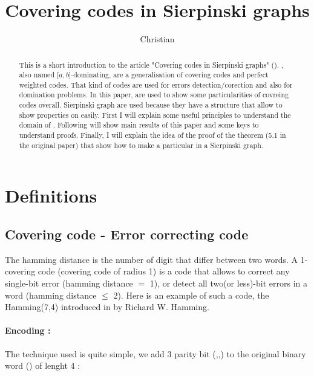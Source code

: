 \documentclass[10pt,a4paper,notitlepage]{article}
\title{Covering codes in Sierpinski graphs}
\subtitle{}
\author{
	\student{Glacet} {Christian} \vskip 0.2cm 
}
\begin{document}
\reversemarginpar{}
\maketitle

\begin{abstract}
This is a short introduction to the article "Covering codes in Sierpinski graphs" (\cite{Art}). 
\ABc, also named [$a,b$]-dominating, are a generalisation of covering codes and 
perfect weighted codes. That kind of codes are used for errors detection/corection 
and also for domination problems. 
In this paper, \ABc are used to show some particularities of covreing codes overall.
Sierpinski graph are used because they have a structure that allow to show properties 
on \ABc easily.
First I will explain some useful principles to understand the domain of \cite{Art}.
Following will show main results of this paper and some keys to understand proofs.
Finally, I will explain the idea of the proof of the theorem (5.1 in the original paper) 
that show how to make a particular \ABc in a Sierpinski graph.
\end{abstract}
\Hline{0.8 pt}
\bigjump

\section{Definitions} 


\subsection{Covering code - Error correcting code}\label{sec:covercode}

The hamming distance is the number of digit that differ between two words.
A 1-covering code (covering code of radius 1) is a code that allows to correct any
 single-bit error (hamming distance $=$ 1), or detect all two(or less)-bit errors 
 in a word (hamming distance $\leq$ 2). Here is an example of such a code, 
 the Hamming(7,4) introduced in \cite{hamm} by Richard W. Hamming.

\paragraph{Encoding :}
The technique used is quite simple, we add 3 parity bit (,,) 
to the original binary word () of lenght 4 :
\end{document}
